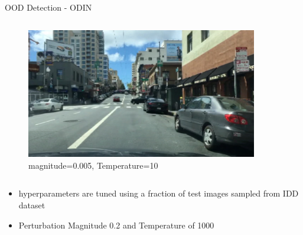 \documentclass[10pt, aspectratio=169]{beamer}
\begin{document}
\begin{frame}[allowframebreaks]{OOD Detection - ODIN}
\begin{columns}[c]
            \begin{column}{.33\textwidth}
                \begin{figure}
                    \centering
                    \includegraphics[width=0.9\textwidth]{images/image_0.005_10.png}
                    \caption{magnitude=0.005, Temperature=10}
                \end{figure}
                \end{column}
        \end{columns}

        \begin{itemize}
            \item hyperparameters are tuned using a fraction of test images sampled from IDD dataset
            \item Perturbation Magnitude 0.2 and Temperature of 1000
        \end{itemize}

        \framebreak


\end{frame}
\end{document}
